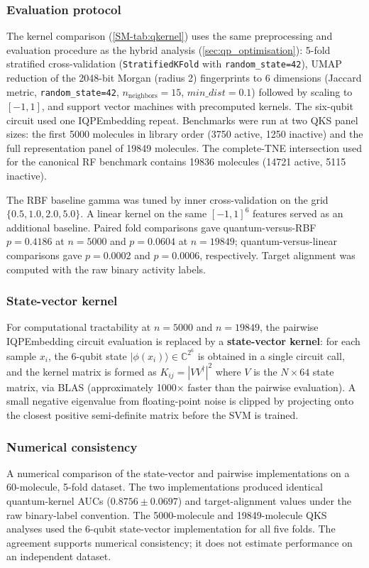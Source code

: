 \documentclass[11pt,a4paper]{article}
\begin{document}
\subsubsection{Evaluation protocol}
The kernel comparison (\cref{SM-tab:qkernel}) uses the same preprocessing and evaluation procedure as the hybrid analysis (\cref{sec:qp_optimisation}): 5-fold stratified cross-validation (\texttt{StratifiedKFold} with \texttt{random\_state=42}), UMAP reduction of the 2048-bit Morgan (radius 2) fingerprints to 6 dimensions (Jaccard metric, \texttt{random\_state=42}, $n_{\text{neighbors}}=15$, $min\_dist=0.1$) followed by scaling to $[-1,1]$, and support vector machines with precomputed kernels. The six-qubit circuit used one IQPEmbedding repeat. Benchmarks were run at two QKS panel sizes: the first \num{5000} molecules in library order (\num{3750} active, \num{1250} inactive) and the full representation panel of \num{19849} molecules. The complete-TNE intersection used for the canonical RF benchmark contains \num{19836} molecules (\num{14721} active, \num{5115} inactive).

The RBF baseline gamma was tuned by inner cross-validation on the grid $\{0.5, 1.0, 2.0, 5.0\}$. A linear kernel on the same $[-1,1]^6$ features served as an additional baseline. Paired fold comparisons gave quantum-versus-RBF $p=0.4186$ at $n=5000$ and $p=0.0604$ at $n=19849$; quantum-versus-linear comparisons gave $p=0.0002$ and $p=0.0006$, respectively. Target alignment was computed with the raw binary activity labels.

\subsubsection{State-vector kernel}
For computational tractability at $n=\num{5000}$ and $n=\num{19849}$, the pairwise IQPEmbedding circuit evaluation is replaced by a \textbf{state-vector kernel}: for each sample $x_i$, the 6-qubit state $|\phi(x_i)\rangle \in \mathbb{C}^{2^6}$ is obtained in a single circuit call, and the kernel matrix is formed as $K_{ij} = |V V^\dagger|^2$ where $V$ is the $N \times 64$ state matrix, via BLAS (approximately \num{1000}$\times$ faster than the pairwise evaluation). A small negative eigenvalue from floating-point noise is clipped by projecting onto the closest positive semi-definite matrix before the SVM is trained.

\subsubsection{Numerical consistency}
A numerical comparison of the state-vector and pairwise implementations on a 60-molecule, 5-fold dataset. The two implementations produced identical quantum-kernel AUCs ($\num{0.8756}\pm\num{0.0697}$) and target-alignment values under the raw binary-label convention. The \num{5000}-molecule and \num{19849}-molecule QKS analyses used the 6-qubit state-vector implementation for all five folds. The agreement supports numerical consistency; it does not estimate performance on an independent dataset.
\end{document}
